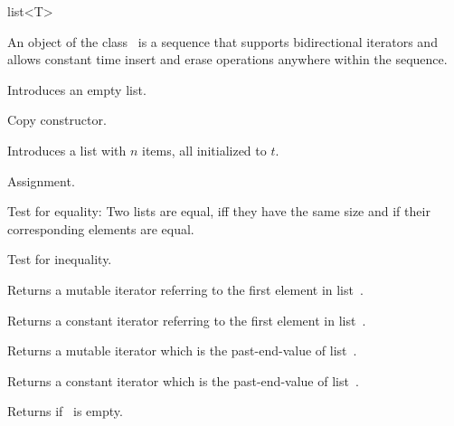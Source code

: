 
\ccHtmlNoClassLinks
\begin{ccClassTemplate} {list<T>}


\ccDefinition
An object of the class \ccClassName\ is a sequence that supports
bidirectional iterators and allows constant time insert and erase
operations anywhere within the sequence.

\ccHtmlLinksOff
{}
\ccHtmlLinksOn

\ccTypes
{}

\ccCreation
{}


             {Introduces an empty list.}

 	    {Copy constructor.}

            {Introduces a list with $n$ items, all initialized to $t$.}



\ccOperations

        {Assignment.}

       {Test for equality: Two lists are equal, iff they have the same size
        and if their corresponding elements are equal.}

       {Test for inequality.}

       {Returns a mutable iterator referring to the first element in
        list~\ccVar.}

\renewcommand{\ccTagRmTrailingConst}{\ccFalse}
       {Returns a constant iterator referring to the first element in
        list~\ccVar.}
\renewcommand{\ccTagRmTrailingConst}{\ccTrue}

       {Returns a mutable iterator which is the past-end-value of
        list~\ccVar.}

\renewcommand{\ccTagRmTrailingConst}{\ccFalse}
       {Returns a constant iterator which is the past-end-value of 
        list~\ccVar.}
\renewcommand{\ccTagRmTrailingConst}{\ccTrue}

	{Returns  if \ccVar\ is empty.}


\end{ccClassTemplate}
